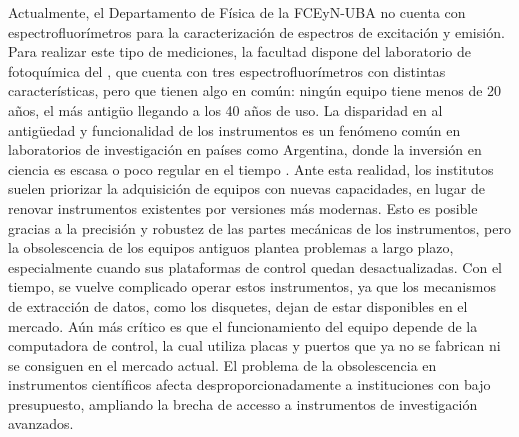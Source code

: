 Actualmente, el Departamento de Física de la FCEyN-UBA no cuenta con espectrofluorímetros para la caracterización de espectros de excitación y emisión.  
Para realizar este tipo de mediciones, la facultad dispone del laboratorio de fotoquímica del , que cuenta con tres espectrofluorímetros con distintas características, pero que tienen algo en común: ningún equipo tiene menos de 20 años, el más antigüo llegando a los 40 años de uso.
La disparidad en al antigüedad y funcionalidad de los instrumentos es un fenómeno común en laboratorios de investigación en países como Argentina, donde la inversión en ciencia es escasa o poco regular en el tiempo \cite{cioccaRealityScientificResearch2017}. 
Ante esta realidad, los institutos suelen priorizar la adquisición de equipos con nuevas capacidades, en lugar de renovar instrumentos existentes por versiones más modernas.  
Esto es posible gracias a la precisión y robustez de las partes mecánicas de los instrumentos, pero la obsolescencia de los equipos antiguos plantea problemas a largo plazo, especialmente cuando sus plataformas de control quedan desactualizadas.  
Con el tiempo, se vuelve complicado operar estos instrumentos, ya que los mecanismos de extracción de datos, como los disquetes, dejan de estar disponibles en el mercado. 
Aún más crítico es que el funcionamiento del equipo depende de la computadora de control, la cual utiliza placas y puertos que ya no se fabrican ni se consiguen en el mercado actual.  
El problema de la obsolescencia en instrumentos científicos afecta desproporcionadamente a instituciones con bajo presupuesto, ampliando la brecha de accesso a instrumentos de investigación avanzados.

